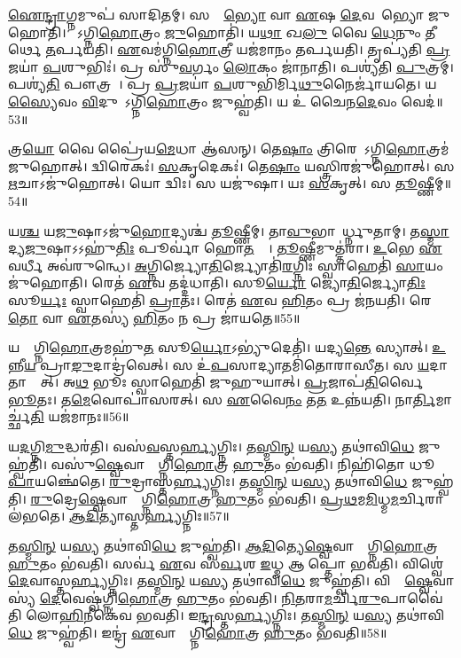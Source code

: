 \ul{𑌐}\ul{𑌨𑍍𑌦𑍍𑌰𑌾}𑌗𑍍𑌨𑌮𑍁𑌪॑ 𑌸𑌾𑌦𑌿𑌤𑌮𑍍।
𑌸𑌰𑍍𑌵𑌾᳚\ul{𑌭𑍍𑌯𑍋} 𑌵𑌾 \ul{𑌏}𑌷 \ul{𑌦𑍇}𑌵𑌤𑌾᳚𑌭𑍍𑌯𑍋 𑌜𑍁𑌹𑍋𑌤𑌿।
𑌯𑍋᳚𑌽𑌗𑍍𑌨𑌿\ul{𑌹𑍋}𑌤𑍍𑌰𑌂 \ul{𑌜𑍁}𑌹𑍋𑌤𑌿॑।
𑌯\ul{𑌥𑌾} 𑌖\ul{𑌲𑍁} 𑌵𑍈 \ul{𑌧𑍇}𑌨𑍁𑌂 \ul{𑌤𑍀}𑌰𑍍𑌥𑍇 \ul{𑌤}𑌰𑍍𑌪𑌯॑𑌤𑌿।
\ul{𑌏}𑌵𑌮॑𑌗𑍍𑌨𑌿\ul{𑌹𑍋}𑌤𑍍𑌰𑍀 𑌯𑌜॑𑌮𑌾𑌨𑌂 𑌤𑌰𑍍𑌪𑌯𑌤𑌿।
𑌤𑍃𑌪𑍍𑌯॑𑌤𑌿 \ul{𑌪𑍍𑌰}𑌜𑌯𑌾॑ \ul{𑌪}𑌶𑍁𑌭𑌿𑌃॑।
𑌪𑍍𑌰 𑌸𑍁॑\ul{𑌵}𑌰𑍍𑌗𑌂 \ul{𑌲𑍋}𑌕𑌂 𑌜𑌾॑𑌨𑌾𑌤𑌿।
𑌪𑌶𑍍𑌯॑𑌤𑌿 \ul{𑌪𑍁}𑌤𑍍𑌰𑌮𑍍।
𑌪𑌶𑍍𑌯॑\ul{𑌤𑌿} 𑌪𑍗𑌤𑍍𑌰𑌮𑍍᳚।
𑌪𑍍𑌰 \ul{𑌪𑍍𑌰}𑌜𑌯𑌾॑ \ul{𑌪}𑌶𑍁𑌭𑌿॑𑌰𑍍𑌮𑌿\ul{𑌥𑍁}𑌨𑍈𑌰𑍍𑌜𑌾॑𑌯𑌤𑍇।
𑌯\ul{𑌸𑍍𑌯𑍈}𑌵𑌂 \ul{𑌵𑌿}𑌦𑍁𑌷𑍋᳚\-𑌽𑌗𑍍𑌨𑌿\ul{𑌹𑍋}𑌤𑍍𑌰𑌂 𑌜𑍁𑌹𑍍𑌵॑𑌤𑌿।
𑌯 𑌉॑ 𑌚𑍈𑌨\ul{𑌦𑍇}𑌵𑌂 𑌵𑍇𑌦॑॥53॥\anuvakamend[𑌬𑍁𑌭𑍂॑𑌷𑍇\ul{𑌦𑍍𑌧𑍍𑌰𑌿}𑌯𑌮𑌾॑𑌣𑌞𑍍𑌜𑌾𑌯\ul{𑌤𑍇} 𑌦𑍍𑌵𑍇 𑌚॑]

𑌤𑍍𑌰\ul{𑌯𑍋} 𑌵𑍈 𑌪𑍍𑌰𑍈॑𑌯\ul{𑌮𑍇}𑌧𑌾 𑌆॑𑌸𑌨𑍍।
𑌤𑍇\ul{𑌷𑌾𑌂} 𑌤𑍍𑌰𑌿𑌰𑍇𑌕𑍋᳚\-𑌽𑌗𑍍𑌨𑌿\ul{𑌹𑍋}𑌤𑍍𑌰𑌮॑𑌜𑍁𑌹𑍋𑌤𑍍।
𑌦𑍍𑌵𑌿𑌰𑍇𑌕𑌃॑।
\ul{𑌸}𑌕𑍃𑌦𑍇𑌕𑌃॑।
𑌤𑍇\ul{𑌷𑌾𑌂} 𑌯𑌸𑍍𑌤𑍍𑌰𑌿𑌰𑌜𑍁॑𑌹𑍋𑌤𑍍।
𑌸 \ul{𑌋}𑌚𑌾\-𑌽𑌜𑍁॑𑌹𑍋𑌤𑍍।
𑌯𑍋 𑌦𑍍𑌵𑌿𑌃।
𑌸 𑌯𑌜𑍁॑𑌷𑌾।
𑌯𑌃 \ul{𑌸}𑌕𑍃𑌤𑍍।
𑌸 \ul{𑌤𑍂}𑌷𑍍𑌣𑍀𑌮𑍍॥54॥

𑌯\ul{𑌶𑍍𑌚} 𑌯\ul{𑌜𑍁}𑌷𑌾\-𑌽𑌜𑍁॑\ul{𑌹𑍋}𑌦𑍍𑌯𑌶𑍍𑌚॑ \ul{𑌤𑍂}𑌷𑍍𑌣𑍀𑌮𑍍।
𑌤𑌾\ul{𑌵𑍁}𑌭𑌾𑌵𑌾᳚𑌰𑍍𑌧𑍍𑌨𑍁𑌤𑌾𑌮𑍍।
𑌤\ul{𑌸𑍍𑌮𑌾}𑌦𑍍𑌯\ul{𑌜𑍁}𑌷𑌾\-𑌽𑌽𑌹𑍁॑\ul{𑌤𑌿𑌃} 𑌪𑍂𑌰𑍍𑌵𑌾॑ 𑌹𑍋\ul{𑌤}𑌵𑍍𑌯𑌾᳚।
\ul{𑌤𑍂}𑌷𑍍𑌣𑍀𑌮𑍁𑌤𑍍𑌤॑𑌰𑌾।
\ul{𑌉}𑌭𑍇 \ul{𑌏}𑌵𑌰𑍍𑌧𑍀 𑌅𑌵॑𑌰𑍁𑌨𑍍𑌧𑍇।
\ul{𑌅}𑌗𑍍𑌨𑌿𑌰𑍍𑌜𑍍𑌯𑍋\ul{𑌤𑌿}𑌰𑍍𑌜𑍍𑌯𑍋𑌤𑌿॑\ul{𑌰}𑌗𑍍𑌨𑌿𑌃 𑌸𑍍𑌵𑌾𑌹𑍇𑌤𑌿॑ \ul{𑌸𑌾}𑌯𑌂 𑌜𑍁॑𑌹𑍋𑌤𑌿।
𑌰𑍇𑌤॑ \ul{𑌏}𑌵 𑌤𑌦𑍍𑌦॑𑌧𑌾𑌤𑌿।
𑌸𑍂\ul{𑌰𑍍𑌯𑍋} 𑌜𑍍𑌯𑍋\ul{𑌤𑌿}𑌰𑍍𑌜𑍍𑌯𑍋\ul{𑌤𑌿𑌃} 𑌸𑍂\ul{𑌰𑍍𑌯𑌃} 𑌸𑍍𑌵𑌾𑌹𑍇𑌤𑌿॑ \ul{𑌪𑍍𑌰𑌾}𑌤𑌃।
𑌰𑍇𑌤॑ \ul{𑌏}𑌵 \ul{𑌹𑌿}𑌤𑌂 𑌪𑍍𑌰 𑌜॑𑌨𑌯𑌤𑌿।
𑌰𑍇\ul{𑌤𑍋} 𑌵𑌾 \ul{𑌏}𑌤𑌸𑍍𑌯॑ \ul{𑌹𑌿}𑌤𑌂 𑌨 𑌪𑍍𑌰 𑌜𑌾॑𑌯𑌤𑍇॥55॥

𑌯𑌸𑍍𑌯𑌾᳚𑌗𑍍𑌨𑌿\ul{𑌹𑍋}𑌤𑍍𑌰𑌮𑌹𑍁॑\ul{𑌤}\ul{} 𑌸𑍂\ul{𑌰𑍍𑌯𑍋}\-𑌽𑌭𑍍𑌯𑍁॑𑌦𑍇𑌤𑌿॑।
𑌯𑌦𑍍𑌯\ul{𑌨𑍍𑌤𑍇} 𑌸𑍍𑌯𑌾𑌤𑍍।
\ul{𑌉}𑌨𑍍𑌨𑍀\ul{𑌯} 𑌪𑍍𑌰𑌾\ul{𑌙𑍁}𑌦𑌾𑌦𑍍𑌰॑𑌵𑍇𑌤𑍍।
𑌸 𑌉॑\ul{𑌪}𑌸𑌾𑌦𑍍𑌯𑌾𑌤𑌮𑌿॑𑌤𑍋𑌰𑌾𑌸𑍀𑌤।
𑌸 \ul{𑌯}𑌦𑌾 𑌤𑌾𑌮𑍍𑌯𑍇᳚𑌤𑍍।
𑌅\ul{𑌥} 𑌭𑍂𑌃 𑌸𑍍𑌵𑌾𑌹𑍇𑌤𑌿॑ 𑌜𑍁𑌹𑍁𑌯𑌾𑌤𑍍।
\ul{𑌪𑍍𑌰}𑌜𑌾𑌪॑\ul{𑌤𑌿}𑌰𑍍𑌵𑍈 \ul{𑌭𑍂}𑌤𑌃।
𑌤\ul{𑌮𑍇}𑌵𑍋𑌪𑌾॑𑌸𑌰𑌤𑍍।
𑌸 \ul{𑌏}𑌵𑍈\ul{𑌨𑌂} 𑌤\ul{𑌤} 𑌉𑌨𑍍𑌨॑𑌯𑌤𑌿।
𑌨𑌾\ul{𑌰𑍍𑌤𑌿}𑌮𑌾𑌰𑍍𑌚𑍍𑌛॑\ul{𑌤𑌿} 𑌯𑌜॑𑌮𑌾𑌨𑌃॥56॥\anuvakamend[\ul{𑌤𑍂}𑌷𑍍𑌣𑍀𑌂 𑌜𑌾॑𑌯\ul{𑌤𑍇} 𑌯𑌜॑𑌮𑌾𑌨𑌃]

𑌯\ul{𑌦}𑌗𑍍𑌨𑌿\ul{𑌮𑍁}𑌦𑍍𑌧𑌰॑𑌤𑌿।
𑌵𑌸॑\ul{𑌵}𑌸𑍍𑌤\ul{𑌰𑍍𑌹𑍍𑌯}𑌗𑍍𑌨𑌿𑌃।
𑌤\ul{𑌸𑍍𑌮𑌿}\ul{𑌨𑍍} 𑌯\ul{𑌸𑍍𑌯} 𑌤𑌥𑌾॑𑌵𑌿\ul{𑌧𑍇} 𑌜𑍁𑌹𑍍𑌵॑𑌤𑌿।
𑌵𑌸𑍁॑\ul{𑌷𑍍𑌵𑍇}𑌵𑌾𑌸𑍍𑌯𑌾᳚𑌗𑍍𑌨𑌿\ul{𑌹𑍋}𑌤𑍍𑌰 \ul{𑌹𑍁}𑌤𑌂 𑌭॑𑌵𑌤𑌿।
𑌨𑌿𑌹𑌿॑𑌤𑍋 𑌧𑍂\ul{𑌪𑌾}𑌯𑌞𑍍𑌛𑍇॑𑌤𑍇।
\ul{𑌰𑍁}𑌦𑍍𑌰𑌾𑌸𑍍𑌤\ul{𑌰𑍍𑌹𑍍𑌯}𑌗𑍍𑌨𑌿𑌃।
𑌤\ul{𑌸𑍍𑌮𑌿}\ul{𑌨𑍍} 𑌯\ul{𑌸𑍍𑌯} 𑌤𑌥𑌾॑𑌵𑌿\ul{𑌧𑍇} 𑌜𑍁𑌹𑍍𑌵॑𑌤𑌿।
\ul{𑌰𑍁}𑌦𑍍𑌰𑍇\ul{𑌷𑍍𑌵𑍇}𑌵𑌾𑌸𑍍𑌯𑌾᳚𑌗𑍍𑌨𑌿\ul{𑌹𑍋}𑌤𑍍𑌰 \ul{𑌹𑍁}𑌤𑌂 𑌭॑𑌵𑌤𑌿।
\ul{𑌪𑍍𑌰}\ul{𑌥}𑌮\ul{𑌮𑌿}𑌧𑍍𑌮\ul{𑌮}𑌰𑍍𑌚𑌿𑌰𑌾 𑌲॑𑌭𑌤𑍇।
\ul{𑌆}\ul{𑌦𑌿}𑌤𑍍𑌯𑌾𑌸𑍍𑌤\ul{𑌰𑍍𑌹𑍍𑌯}𑌗𑍍𑌨𑌿𑌃॥57॥

𑌤\ul{𑌸𑍍𑌮𑌿}\ul{𑌨𑍍} 𑌯\ul{𑌸𑍍𑌯} 𑌤𑌥𑌾॑𑌵𑌿\ul{𑌧𑍇} 𑌜𑍁𑌹𑍍𑌵॑𑌤𑌿।
\ul{𑌆}\ul{𑌦𑌿}𑌤𑍍𑌯𑍇\ul{𑌷𑍍𑌵𑍇}𑌵𑌾𑌸𑍍𑌯𑌾᳚𑌗𑍍𑌨𑌿\ul{𑌹𑍋}𑌤𑍍𑌰 \ul{𑌹𑍁}𑌤𑌂 𑌭॑𑌵𑌤𑌿।
𑌸𑌰𑍍𑌵॑ \ul{𑌏}𑌵 𑌸॑\ul{𑌰𑍍𑌵}𑌶 \ul{𑌇}𑌧𑍍𑌮 𑌆𑌦𑍀᳚𑌪𑍍𑌤𑍋 𑌭𑌵𑌤𑌿।
𑌵𑌿𑌶𑍍𑌵𑍇॑ \ul{𑌦𑍇}𑌵𑌾𑌸𑍍𑌤\ul{𑌰𑍍𑌹𑍍𑌯}𑌗𑍍𑌨𑌿𑌃।
𑌤\ul{𑌸𑍍𑌮𑌿}\ul{𑌨𑍍} 𑌯\ul{𑌸𑍍𑌯} 𑌤𑌥𑌾॑𑌵𑌿\ul{𑌧𑍇} 𑌜𑍁𑌹𑍍𑌵॑𑌤𑌿।
𑌵𑌿𑌶𑍍𑌵𑍇᳚\ul{𑌷𑍍𑌵𑍇}𑌵𑌾𑌸𑍍𑌯॑ \ul{𑌦𑍇}𑌵𑍇𑌷𑍍𑌵॑𑌗𑍍𑌨𑌿\ul{𑌹𑍋}𑌤𑍍𑌰 \ul{𑌹𑍁}𑌤𑌂 𑌭॑𑌵𑌤𑌿।
\ul{𑌨𑌿}\ul{𑌤}𑌰𑌾\ul{𑌮}𑌰𑍍𑌚𑌿\ul{𑌰𑍁}𑌪𑌾𑌵𑍈॑𑌤𑌿 𑌲𑍋\ul{𑌹𑌿}𑌨𑍀𑌕𑍇॑𑌵 𑌭𑌵𑌤𑌿।
𑌇\ul{𑌨𑍍𑌦𑍍𑌰}𑌸𑍍𑌤\ul{𑌰𑍍𑌹𑍍𑌯}𑌗𑍍𑌨𑌿𑌃।
𑌤\ul{𑌸𑍍𑌮𑌿}\ul{𑌨𑍍} 𑌯\ul{𑌸𑍍𑌯} 𑌤𑌥𑌾॑𑌵𑌿\ul{𑌧𑍇} 𑌜𑍁𑌹𑍍𑌵॑𑌤𑌿।
𑌇𑌨𑍍𑌦𑍍𑌰॑ \ul{𑌏}𑌵𑌾𑌸𑍍𑌯𑌾᳚𑌗𑍍𑌨𑌿\ul{𑌹𑍋}𑌤𑍍𑌰 \ul{𑌹𑍁}𑌤𑌂 𑌭॑𑌵𑌤𑌿॥58॥

